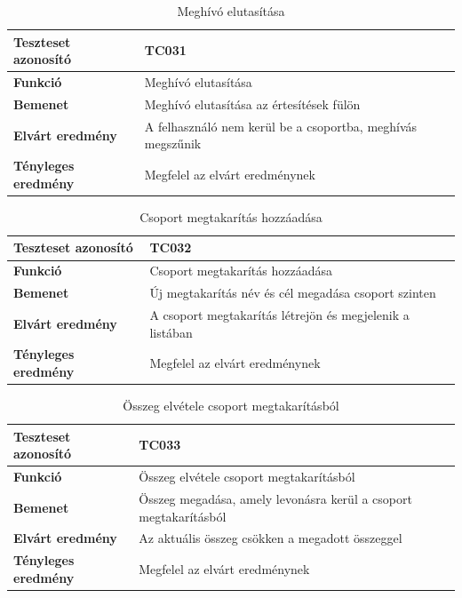 \begin{table}[h!]
	\centering
	\begin{tabular}{|l|p{10cm}|}
		\hline
		\textbf{Teszteset azonosító} & TC031 \\ \hline
		\textbf{Funkció} & Meghívó elutasítása \\ \hline
		\textbf{Bemenet} & Meghívó elutasítása az értesítések fülön \\ \hline
		\textbf{Elvárt eredmény} & A felhasználó nem kerül be a csoportba, meghívás megszűnik \\ \hline
		\textbf{Tényleges eredmény} & Megfelel az elvárt eredménynek \\ \hline
	\end{tabular}
	\caption{Meghívó elutasítása}
	\label{tab:meghivo_elutasitasa}
\end{table}

\begin{table}[h!]
	\centering
	\begin{tabular}{|l|p{10cm}|}
		\hline
		\textbf{Teszteset azonosító} & TC032 \\ \hline
		\textbf{Funkció} & Csoport megtakarítás hozzáadása \\ \hline
		\textbf{Bemenet} & Új megtakarítás név és cél megadása csoport szinten \\ \hline
		\textbf{Elvárt eredmény} & A csoport megtakarítás létrejön és megjelenik a listában \\ \hline
		\textbf{Tényleges eredmény} & Megfelel az elvárt eredménynek \\ \hline
	\end{tabular}
	\caption{Csoport megtakarítás hozzáadása}
	\label{tab:csoport_megtakaritas_hozzaadas}
\end{table}

\begin{table}[h!]
	\centering
	\begin{tabular}{|l|p{10cm}|}
		\hline
		\textbf{Teszteset azonosító} & TC033 \\ \hline
		\textbf{Funkció} & Összeg elvétele csoport megtakarításból \\ \hline
		\textbf{Bemenet} & Összeg megadása, amely levonásra kerül a csoport megtakarításból \\ \hline
		\textbf{Elvárt eredmény} & Az aktuális összeg csökken a megadott összeggel \\ \hline
		\textbf{Tényleges eredmény} & Megfelel az elvárt eredménynek \\ \hline
	\end{tabular}
	\caption{Összeg elvétele csoport megtakarításból}
	\label{tab:csoport_megtakaritas_elvetel}
\end{table}

